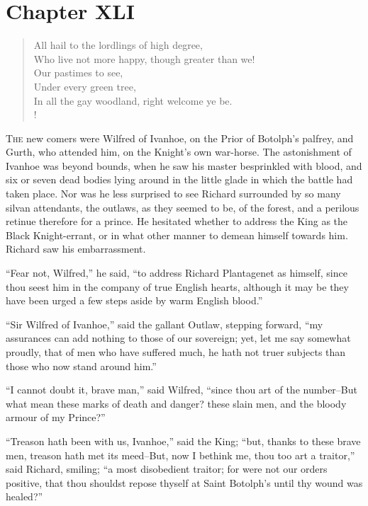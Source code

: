 \chapter{Chapter XLI}

\begin{verse}
All hail to the lordlings of high degree,\\
Who live not more happy, though greater than we!\\
Our pastimes to see,\\
Under every green tree,\\
In all the gay woodland, right welcome ye be.\\!
\end{verse}

\lettrine{T}{he} new comers were Wilfred of Ivanhoe, on the Prior of
Botolph's
palfrey, and Gurth, who attended him, on the Knight's own war-horse. The
astonishment of Ivanhoe was beyond bounds, when he saw his master
besprinkled with blood, and six or seven dead bodies lying around in the
little glade in which the battle had taken place. Nor was he less
surprised to see Richard surrounded by so many silvan attendants, the
outlaws, as they seemed to be, of the forest, and a perilous retinue
therefore for a prince. He hesitated whether to address the King as the
Black Knight-errant, or in what other manner to demean himself towards
him. Richard saw his embarrassment.

``Fear not, Wilfred,'' he said, ``to address Richard Plantagenet as
himself, since thou seest him in the company of true English hearts,
although it may be they have been urged a few steps aside by warm
English blood.''

``Sir Wilfred of Ivanhoe,'' said the gallant Outlaw, stepping forward,
``my assurances can add nothing to those of our sovereign; yet, let me
say somewhat proudly, that of men who have suffered much, he hath not
truer subjects than those who now stand around him.''

``I cannot doubt it, brave man,'' said Wilfred, ``since thou art of the
number--But what mean these marks of death and danger? these slain men,
and the bloody armour of my Prince?''

``Treason hath been with us, Ivanhoe,'' said the King; ``but, thanks to
these brave men, treason hath met its meed--But, now I bethink me, thou
too art a traitor,'' said Richard, smiling; ``a most disobedient
traitor; for were not our orders positive, that thou shouldst repose
thyself at Saint Botolph's until thy wound was healed?''

